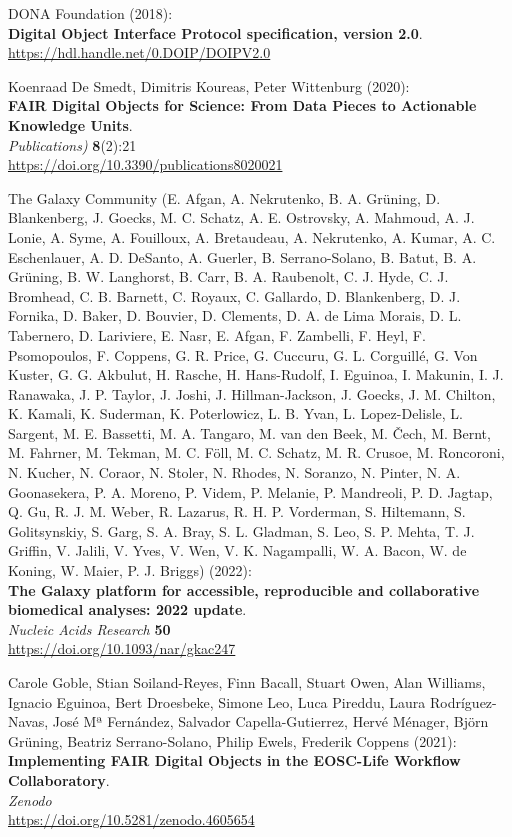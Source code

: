 \begin{thebibliography}{9}
 DONA Foundation (2018):\\
\textbf{Digital Object Interface Protocol specification, version 2.0}.\\
\url{https://hdl.handle.net/0.DOIP/DOIPV2.0}

 Koenraad De Smedt, Dimitris Koureas, Peter
Wittenburg (2020):\\
\textbf{FAIR Digital Objects for Science: From Data Pieces to Actionable
Knowledge Units}.\\
\emph{Publications)} \textbf{8}(2):21\\
\url{https://doi.org/10.3390/publications8020021}

 The Galaxy Community (E. Afgan, A. Nekrutenko, B. A.
Grüning, D. Blankenberg, J. Goecks, M. C. Schatz, A. E. Ostrovsky, A.
Mahmoud, A. J. Lonie, A. Syme, A. Fouilloux, A. Bretaudeau, A.
Nekrutenko, A. Kumar, A. C. Eschenlauer, A. D. DeSanto, A. Guerler, B.
Serrano-Solano, B. Batut, B. A. Grüning, B. W. Langhorst, B. Carr, B. A.
Raubenolt, C. J. Hyde, C. J. Bromhead, C. B. Barnett, C. Royaux, C.
Gallardo, D. Blankenberg, D. J. Fornika, D. Baker, D. Bouvier, D.
Clements, D. A. de Lima Morais, D. L. Tabernero, D. Lariviere, E. Nasr,
E. Afgan, F. Zambelli, F. Heyl, F. Psomopoulos, F. Coppens, G. R. Price,
G. Cuccuru, G. L. Corguillé, G. Von Kuster, G. G. Akbulut, H. Rasche, H.
Hans-Rudolf, I. Eguinoa, I. Makunin, I. J. Ranawaka, J. P. Taylor, J.
Joshi, J. Hillman-Jackson, J. Goecks, J. M. Chilton, K. Kamali, K.
Suderman, K. Poterlowicz, L. B. Yvan, L. Lopez-Delisle, L. Sargent, M.
E. Bassetti, M. A. Tangaro, M. van den Beek, M. Čech, M. Bernt, M.
Fahrner, M. Tekman, M. C. Föll, M. C. Schatz, M. R. Crusoe, M.
Roncoroni, N. Kucher, N. Coraor, N. Stoler, N. Rhodes, N. Soranzo, N.
Pinter, N. A. Goonasekera, P. A. Moreno, P. Videm, P. Melanie, P.
Mandreoli, P. D. Jagtap, Q. Gu, R. J. M. Weber, R. Lazarus, R. H. P.
Vorderman, S. Hiltemann, S. Golitsynskiy, S. Garg, S. A. Bray, S. L.
Gladman, S. Leo, S. P. Mehta, T. J. Griffin, V. Jalili, V. Yves, V. Wen,
V. K. Nagampalli, W. A. Bacon, W. de Koning, W. Maier, P. J. Briggs)
(2022):\\
\textbf{The Galaxy platform for accessible, reproducible and
collaborative biomedical analyses: 2022 update}.\\
\emph{Nucleic Acids Research} \textbf{50}\\
\url{https://doi.org/10.1093/nar/gkac247}

 Carole Goble, Stian Soiland-Reyes, Finn Bacall, Stuart
Owen, Alan Williams, Ignacio Eguinoa, Bert Droesbeke, Simone Leo, Luca
Pireddu, Laura Rodríguez-Navas, José Mª Fernández, Salvador
Capella-Gutierrez, Hervé Ménager, Björn Grüning, Beatriz Serrano-Solano,
Philip Ewels, Frederik Coppens (2021):\\
\textbf{Implementing FAIR Digital Objects in the EOSC-Life Workflow
Collaboratory}.\\
\emph{Zenodo}\\
\url{https://doi.org/10.5281/zenodo.4605654}


\end{thebibliography}
